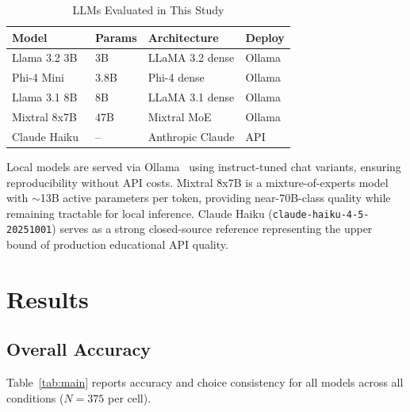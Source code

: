 \documentclass[journal]{IEEEtran}
\begin{document}
\begin{table}[h]
\centering
\caption{LLMs Evaluated in This Study}
\label{tab:models}
\renewcommand{\arraystretch}{1.25}
\begin{tabular}{llll}
\toprule
\textbf{Model} & \textbf{Params} & \textbf{Architecture} & \textbf{Deploy} \\
\midrule
\rowcolor{lightpurple}
Llama 3.2 3B~\cite{llama32}     & 3B   & LLaMA 3.2 dense & Ollama \\
Phi-4 Mini~\cite{phi4}          & 3.8B & Phi-4 dense     & Ollama \\
\rowcolor{lightpurple}
Llama 3.1 8B~\cite{llama31}     & 8B   & LLaMA 3.1 dense & Ollama \\
Mixtral 8x7B~\cite{mixtral}     & 47B  & Mixtral MoE     & Ollama \\
\rowcolor{lightpurple}
Claude Haiku~\cite{claudehaiku} & --   & Anthropic Claude & API   \\
\bottomrule
\end{tabular}
\end{table}

Local models are served via Ollama~\cite{ollama} using instruct-tuned chat
variants, ensuring reproducibility without API costs. Mixtral 8x7B is a
mixture-of-experts model with $\sim$13B active parameters per token,
providing near-70B-class quality while remaining tractable for local
inference. Claude Haiku (\texttt{claude-haiku-4-5-20251001}) serves as a
strong closed-source reference representing the upper bound of production
educational API quality.

\section{Results}
\label{sec:results}

\subsection{Overall Accuracy}

Table~\ref{tab:main} reports accuracy and choice consistency for all models
across all conditions ($N = 375$ per cell).
\end{document}
